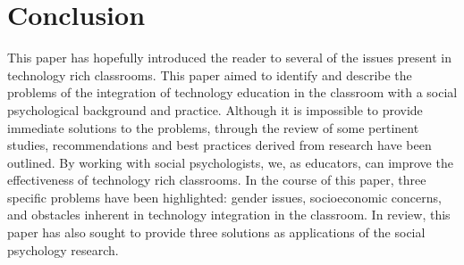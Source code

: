 \chapter{Conclusion}
This paper has hopefully introduced the reader to several of the issues present in technology rich classrooms.  This paper aimed to identify and describe the problems of the integration of technology education in the classroom with a social psychological background and practice. Although it is impossible to provide immediate solutions to the problems, through the review of some pertinent studies, recommendations and best practices derived from research have been outlined.  By working with social psychologists, we, as educators, can improve the effectiveness of technology rich classrooms.  In the course of this paper, three specific problems have been highlighted: gender issues, socioeconomic concerns, and obstacles inherent in technology integration in the classroom. In review, this paper has also sought to provide three solutions as applications of the social psychology research.